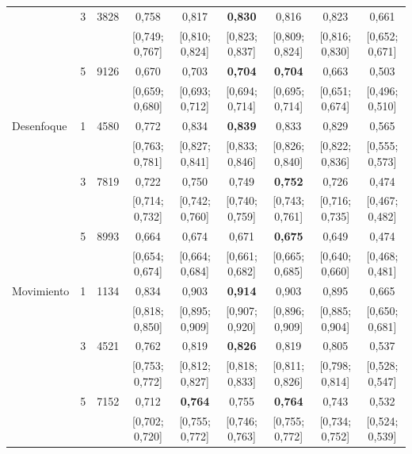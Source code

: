 \begin{table}[tbp]
\begin{tabular}{llrcccccc}
 & 3 & \num{3828} & 0{,}758 & 0{,}817 & \textbf{0{,}830} & 0{,}816 & 0{,}823 & 0{,}661 \\
& & & {\tiny [0{,}749; 0{,}767]} & {\tiny [0{,}810; 0{,}824]} & {\tiny [0{,}823; 0{,}837]} & {\tiny [0{,}809; 0{,}824]} & {\tiny [0{,}816; 0{,}830]} & {\tiny [0{,}652; 0{,}671]} \\[1pt]
 & 5 & \num{9126} & 0{,}670 & 0{,}703 & \textbf{0{,}704} & \textbf{0{,}704} & 0{,}663 & 0{,}503 \\
& & & {\tiny [0{,}659; 0{,}680]} & {\tiny [0{,}693; 0{,}712]} & {\tiny [0{,}694; 0{,}714]} & {\tiny [0{,}695; 0{,}714]} & {\tiny [0{,}651; 0{,}674]} & {\tiny [0{,}496; 0{,}510]} \\[1pt]
\addlinespace[2pt]
Desenfoque & 1 & \num{4580} & 0{,}772 & 0{,}834 & \textbf{0{,}839} & 0{,}833 & 0{,}829 & 0{,}565 \\
& & & {\tiny [0{,}763; 0{,}781]} & {\tiny [0{,}827; 0{,}841]} & {\tiny [0{,}833; 0{,}846]} & {\tiny [0{,}826; 0{,}840]} & {\tiny [0{,}822; 0{,}836]} & {\tiny [0{,}555; 0{,}573]} \\[1pt]
 & 3 & \num{7819} & 0{,}722 & 0{,}750 & 0{,}749 & \textbf{0{,}752} & 0{,}726 & 0{,}474 \\
& & & {\tiny [0{,}714; 0{,}732]} & {\tiny [0{,}742; 0{,}760]} & {\tiny [0{,}740; 0{,}759]} & {\tiny [0{,}743; 0{,}761]} & {\tiny [0{,}716; 0{,}735]} & {\tiny [0{,}467; 0{,}482]} \\[1pt]
 & 5 & \num{8993} & 0{,}664 & 0{,}674 & 0{,}671 & \textbf{0{,}675} & 0{,}649 & 0{,}474 \\
& & & {\tiny [0{,}654; 0{,}674]} & {\tiny [0{,}664; 0{,}684]} & {\tiny [0{,}661; 0{,}682]} & {\tiny [0{,}665; 0{,}685]} & {\tiny [0{,}640; 0{,}660]} & {\tiny [0{,}468; 0{,}481]} \\[1pt]
\addlinespace[2pt]
Movimiento & 1 & \num{1134} & 0{,}834 & 0{,}903 & \textbf{0{,}914} & 0{,}903 & 0{,}895 & 0{,}665 \\
& & & {\tiny [0{,}818; 0{,}850]} & {\tiny [0{,}895; 0{,}909]} & {\tiny [0{,}907; 0{,}920]} & {\tiny [0{,}896; 0{,}909]} & {\tiny [0{,}885; 0{,}904]} & {\tiny [0{,}650; 0{,}681]} \\[1pt]
 & 3 & \num{4521} & 0{,}762 & 0{,}819 & \textbf{0{,}826} & 0{,}819 & 0{,}805 & 0{,}537 \\
& & & {\tiny [0{,}753; 0{,}772]} & {\tiny [0{,}812; 0{,}827]} & {\tiny [0{,}818; 0{,}833]} & {\tiny [0{,}811; 0{,}826]} & {\tiny [0{,}798; 0{,}814]} & {\tiny [0{,}528; 0{,}547]} \\[1pt]
 & 5 & \num{7152} & 0{,}712 & \textbf{0{,}764} & 0{,}755 & \textbf{0{,}764} & 0{,}743 & 0{,}532 \\
& & & {\tiny [0{,}702; 0{,}720]} & {\tiny [0{,}755; 0{,}772]} & {\tiny [0{,}746; 0{,}763]} & {\tiny [0{,}755; 0{,}772]} & {\tiny [0{,}734; 0{,}752]} & {\tiny [0{,}524; 0{,}539]} \\[1pt]
\bottomrule
\end{tabular}


\end{table}
